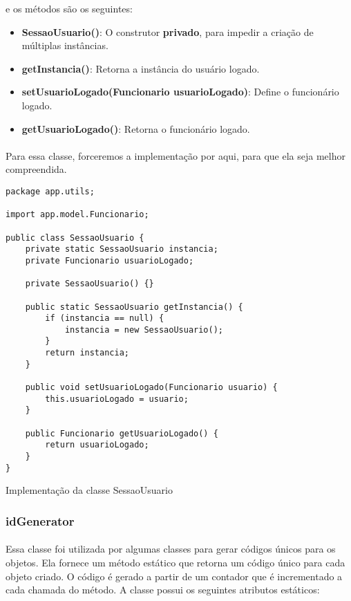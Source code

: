 \documentclass[a4paper,12pt]{article}
\newenvironment{code}{\captionsetup{type=listing}}{}
\begin{document}
\noindent e os métodos são os seguintes:

\begin{itemize}[noitemsep]
    \item \textbf{SessaoUsuario()}: O construtor \textbf{privado}, para impedir a criação de múltiplas instâncias.
    \item \textbf{getInstancia()}: Retorna a instância do usuário logado.
    \item \textbf{setUsuarioLogado(Funcionario usuarioLogado)}: Define o funcionário logado.
    \item \textbf{getUsuarioLogado()}: Retorna o funcionário logado.
\end{itemize}

\paragraph{}
Para essa classe, forceremos a implementação por aqui, para que ela seja melhor compreendida.

\begin{code}
\begin{verbatim}
package app.utils;

import app.model.Funcionario;

public class SessaoUsuario {
    private static SessaoUsuario instancia;
    private Funcionario usuarioLogado;

    private SessaoUsuario() {}

    public static SessaoUsuario getInstancia() {
        if (instancia == null) {
            instancia = new SessaoUsuario();
        }
        return instancia;
    }

    public void setUsuarioLogado(Funcionario usuario) {
        this.usuarioLogado = usuario;
    }

    public Funcionario getUsuarioLogado() {
        return usuarioLogado;
    }
}
\end{verbatim}
\caption{Implementação da classe SessaoUsuario}
\end{code}

\subsubsection{idGenerator}
\paragraph{}
Essa classe foi utilizada por algumas classes para gerar códigos únicos para os objetos. Ela fornece um método estático que retorna um código único para cada objeto criado. O código é gerado a partir de um contador que é incrementado a cada chamada do método. A classe possui os seguintes atributos estáticos:
\end{document}
